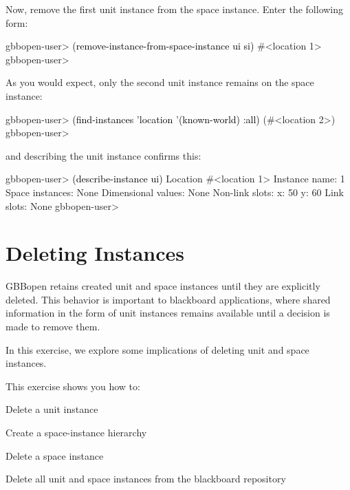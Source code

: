 \documentclass[10pt,twoside,english,pdftex]{article}
\begin{document}
%
%
Now, remove the first  unit instance from the
 space instance.  Enter the following form:
%
\W\supp
\begin{example}
\textcolor{darkergray}{%
  gbbopen-user> \textcolor{black}{(remove-instance-from-space-instance ui si)}
  #<location 1>
  gbbopen-user>}
\end{example}
%
%
As you would expect, only the second  unit instance
remains on the  space instance:
%
\W\supp\notpretop
\begin{example}
\textcolor{darkergray}{%
  gbbopen-user> \textcolor{black}{(find-instances 'location '(known-world) :all)}
  (#<location 2>)
  gbbopen-user>}
\end{example}
%
and describing the  unit instance confirms this:
%
\W\supp\notpretop
\begin{example}
\textcolor{darkergray}{%
  gbbopen-user> \textcolor{black}{(describe-instance ui)}
  Location #<location 1>
    Instance name: 1
    Space instances: None
    Dimensional values: None
    Non-link slots:
      x:  50
      y:  60
    Link slots: None
  gbbopen-user>}
\end{example}


\T\markright{}%
\T\pagestyle{plain}
\T\cleardoublepage
\W{}
\T\pagestyle{fancy}
\T\thispagestyle{fancybottom}
\T\renewcommand{\headrulewidth}{0pt}
\section{Deleting Instances}
\label{sec:deleting-instance}%

GBBopen retains created unit and space instances until they are explicitly
deleted.  This behavior is important to blackboard applications, where shared
information in the form of unit instances remains available until a decision
is made to remove them.

In this exercise, we explore some implications of deleting unit and space
instances.

\fndocrule

This exercise shows you how to:
\begin{tightitemize}
\item Delete a unit instance
\item Create a space-instance hierarchy
\item Delete a space instance
\item Delete all unit and space instances from the blackboard repository
\end{tightitemize}
\end{document}

